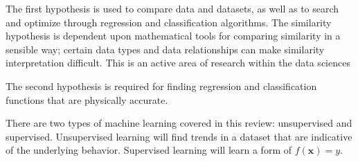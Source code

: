 The first hypothesis is used to compare data and datasets, as well as to search and optimize through regression and classification algorithms. The similarity hypothesis is dependent upon mathematical tools for comparing similarity in a sensible way; certain data types and data relationships can make similarity interpretation difficult. This is an active area of research within the data sciences

The second hypothesis is required for finding regression and classification functions that are physically accurate.

There are two types of machine learning covered in this review: unsupervised and supervised. Unsupervised learning will find trends in a dataset that are indicative of the underlying behavior. Supervised learning will learn a form of $f(\mathbf{x}) = y$. 



